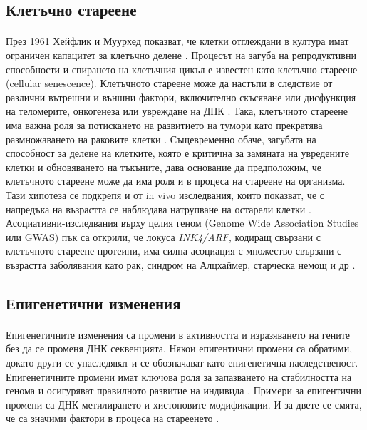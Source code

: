 \documentclass[pdftex,cyrillic,14pt,a4page,twoside,openright]{extreport}
\begin{document}
\subsection{Клетъчно стареене}
\paragraph{}
През 1961 Хейфлик и Муурхед показват, че клетки отглеждани в култура имат ограничен капацитет за клетъчно делене \cite{hayflick1961serial}. Процесът на загуба на репродуктивни способности и спирането на клетъчния цикъл е известен като клетъчно стареене (cellular senescence). Клетъчното стареене може да настъпи в следствие от различни вътрешни и външни фактори, включително скъсяване или дисфункция на теломерите, онкогенеза или увреждане на ДНК \cite{micco2021}. Така, клетъчното стареене има важна роля за потискането на развитието на тумори като прекратява размножаването на раковите клетки \cite{jeyapalan2008}. Същевременно обаче, загубата на способност за делене на клетките, която е критична за замяната на увредените клетки и обновяването на тъкъните, дава основание да предположим, че клетъчното стареене може да има роля и в процеса на стареене на организма. Тази хипотеза се подкрепя и от in vivo изследвания, които показват, че с напредъка на възрастта се наблюдава натрупване на остарели клетки \cite{jeyapalan2008}. Асоциативни-изследвания върху целия геном (Genome Wide Association Studies или GWAS) пък са открили, че локуса \textit{INK4/ARF}, кодиращ свързани с клетъчното стареене протеини, има силна асоциация с множество свързани с възрастта заболявания като рак, синдром на Алцхаймер, старческа немощ и др \cite{jeck2012meta}.

\subsection{Епигенетични изменения}
\paragraph{}
Епигенетичните изменения са промени в активността и изразяването на гените без да се променя ДНК секвенцията. Някои епигентични промени са обратими, докато други се унаследяват и се обозначават като епигенетична наследственост. Епигенетичните промени имат ключова роля за запазването на стабилността на генома и осигуряват правилното развитие на индивида \cite{dupont2009}. Примери за епигентични промени са ДНК метилирането и хистоновите модификации. И за двете се смята, че са значими фактори в процеса на стареенето \cite{daquila2013, aitbaev2019}.
\end{document}
